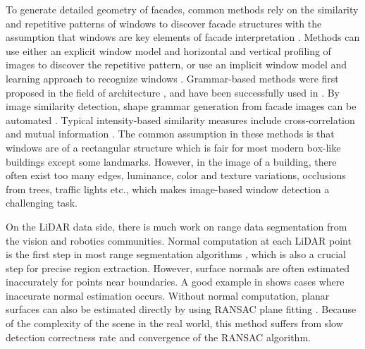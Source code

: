To generate detailed geometry of facades, common methods rely on the similarity and repetitive patterns of windows to discover facade structures with the assumption that windows are key elements of facade interpretation \cite{Muller07, MayerReznik05, Ali07, LeeRam04, Hohmann09cityfit, Wu10}. Methods can use either an explicit window model \cite{LeeRam04} and horizontal and vertical profiling of images to discover the repetitive pattern, or use an implicit window model and learning approach to recognize windows \cite{MayerReznik05, Ali07}. Grammar-based methods were first proposed in the field of architecture \cite{Stiny71shapegrammars}, and have been successfully used in \cite{Wonka03}. By image similarity detection, shape grammar generation from facade images can be automated \cite{Muller07}. Typical intensity-based similarity measures include cross-correlation \cite{LeeRam04} and mutual information \cite{Muller07, Pluim00, Russakoff04imagesimilarity, StudholmeHH99}. The common assumption in these methods is that windows are of a rectangular structure which is fair for most modern box-like buildings except some landmarks. However, in the image of a building, there often exist too many edges, luminance, color and texture variations, occlusions from trees, traffic lights etc., which makes image-based window detection a challenging task.

   On the LiDAR data side, there is much work on range data segmentation \cite{Hoover1996, Jiang96} from the vision and robotics communities. Normal computation at each LiDAR point is the first step in most range segmentation algorithms \cite{Stamos02, Besl88}, which is also a crucial step for precise region extraction. However, surface normals are often estimated inaccurately for points near boundaries. A good example in \cite{Chen07} shows cases where inaccurate normal estimation occurs. Without normal computation, planar surfaces can also be estimated directly by using RANSAC plane fitting \cite{schnabel07}. Because of the complexity of the scene in the real world, this method suffers from slow detection correctness rate and convergence of the RANSAC algorithm.

